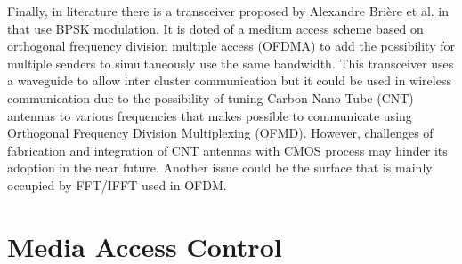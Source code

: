 \documentclass[12pt]{article}
\begin{document}
Finally, in literature there is a transceiver proposed by Alexandre Brière et al. in \citep{2015} that use BPSK modulation. It is doted of a medium access scheme based on orthogonal frequency division multiple access (OFDMA) to add the possibility for multiple senders to simultaneously use the same bandwidth. This transceiver uses a waveguide to allow inter cluster communication but it could be used in wireless communication due to the possibility of tuning Carbon Nano Tube (CNT) antennas to various frequencies that makes possible to communicate using Orthogonal Frequency Division Multiplexing (OFMD). However, challenges of fabrication and integration of CNT antennas with CMOS process may hinder its adoption in the near future. Another issue could be the surface that is mainly occupied by FFT/IFFT used in OFDM.


\section{Media Access Control}
\end{document}
